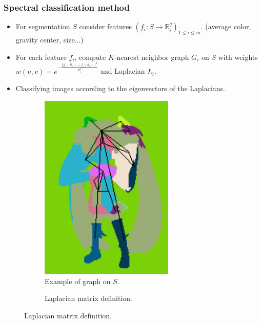 \documentclass{beamer}
\begin{document}
\begin{frame}
\frametitle{Spectral classification method}
\begin{itemize}
\item For segmentation $S$ consider features $(f_i : S \rightarrow \mathbb{R}^q_i)_{1 \leq i \leq m}$. (average color, gravity center, size...)
\item For each feature $f_i$, compute $K$-nearest neighbor graph $G_i$ on $S$ with weights $w(u,v) = e^{-\frac{||f_i(S_u) - f_i(S_v)||^2}{\sigma_i^2}}$ and Laplacian $L_i$.
\item Classifying images according to the eigenvectors of the Laplacians.
\end{itemize}

\begin{figure}[htb!]
\centering
\begin{subfigure}{0.3\textwidth}
\centering
\includegraphics[width=0.7\textwidth]{../images/miku_seg_graph.png}
\caption{Example of graph on $S$.}
\end{subfigure}
\begin{subfigure}{0.65\textwidth}
\caption{Laplacian matrix definition.}
\end{subfigure}
\end{figure}
\end{frame}
\end{document}
